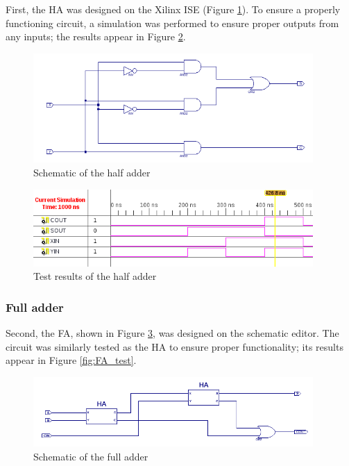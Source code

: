 \documentclass[11pt]{article}
\begin{document}
First, the HA was designed on the Xilinx ISE (Figure \ref{fig:HA_schematic}). To ensure a properly functioning circuit, a simulation was performed to ensure proper outputs from any inputs; the results appear in Figure \ref{fig:HA_test}.

\begin{figure}[htpb]
	\centering
	\includegraphics[width=0.95\textwidth]{HA-schematic}
	\caption{Schematic of the half adder}
	\label{fig:HA_schematic}
\end{figure}

\begin{figure}[htpb]
	\centering
	\includegraphics[width=0.95\textwidth]{HA_test}
	\caption{Test results of the half adder}
	\label{fig:HA_test}
\end{figure}

\subsubsection{Full adder}

Second, the FA, shown in Figure \ref{fig:FA_schematic}, was designed on the schematic editor. The circuit was similarly tested as the HA to ensure proper functionality; its results appear in Figure \ref{fig:FA_test}.

\begin{figure}[htpb]
	\centering
	\includegraphics[width=0.95\textwidth]{FA-schematic}
	\caption{Schematic of the full adder}
	\label{fig:FA_schematic}
\end{figure}
\end{document}

